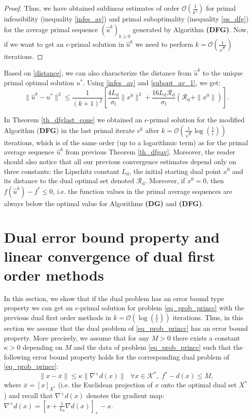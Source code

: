 \documentclass{gOMS2e}
\theoremstyle{plain}
\theoremstyle{definition}
\theoremstyle{remark}
\begin{document}
\begin{proof}
\noindent Thus,  we have obtained sublinear estimates  of order
$\mathcal{O}(\frac{1}{k^2})$ for primal infeasibility (inequality
\eqref{infes_av}) and primal suboptimality (inequality
\eqref{ps_dfg}) for the average primal  sequence $(\hat{u}^k)_{k
\geq 0}$ generated by Algorithm \textbf{(DFG)}.   Now, if we want to
get an $\epsilon$-primal solution in $\hat{u}^{k}$ we need to
perform $k = {\mathcal O} (\frac{1}{\sqrt{\epsilon}})$ iterations.
\end{proof}

\noindent Based on \eqref{distance}, we can also characterize the
distance from $\hat u^k$ to the unique primal optimal solution
$u^*$. Using  \eqref{infes_av} and \eqref{subopt_av_1}, we get:
\[   \| \hat u^k - {}{u}^*\|^2  \leq
\frac{1}{(k+1)^2} \left[ \frac{4 L_\text{d}}{\sigma_{\mathrm{f}}} \|x^0\|^2 + \frac{16 L_\text{d} \mathcal{R}_\text{d}}{\sigma_{\mathrm{f}}}
 (\mathcal{R}_\text{d} + \|x^0\|) \right]. \]

\noindent In Theorem \ref{th_dfglast_cone}  we obtained an
$\epsilon$-primal solution for the modified Algorithm (\textbf{DFG})
in the last primal iterate $v^{k}$ after $k =
\mathcal{O}(\frac{1}{\sqrt{\epsilon}} \log(\frac{1}{\epsilon}))$
iterations, which  is of the same order (up to a logarithmic term)
as for the primal average sequence  $\hat u^k$ from previous Theorem
\ref{th_dfgav}. Moreover, the reader should also notice that all our
previous  convergence estimates depend only on three  constants: the
Lipschitz constant $L_\text{d}$, the initial starting dual point
$x^0$ and its distance to the dual optimal  set denoted
$\mathcal{R}_\text{d}$. Moreover, if $x^0=0$, then $f(\hat u^k) -
f^* \leq 0$, i.e. the function values in  the primal average
sequences  are always below the optimal value for Algorithms
\textbf{(DG)} and \textbf{(DFG)}.

\section{Dual error bound property and linear convergence of dual first order methods}
\label{sec_lin}
In this section, we show that if the dual problem has an error bound type property we can get an $\epsilon$-primal solution for problem \eqref{eq_prob_princc}  with the previous dual first order methods in $k = \mathcal{O}(\log(\frac{1}{\epsilon}))$ iterations. Thus, in this section we assume that the dual problem of \eqref{eq_prob_princc} has an error bound property. More precisely, we assume that  for any $M>0$ there exists a constant  $\kappa > 0$ depending on $M$ and the data of problem \eqref{eq_prob_princc} such that the following
error bound property holds for the  corresponding dual problem of \eqref{eq_prob_princc}:
\begin{equation}
\label{eq_error_bound} \|x - \bar{x}\| \leq \kappa \|\nabla^+
d(x)\| ~~~ \forall x \in {{\mathcal{K}}^*}, \; f^* - d(x) \leq M,
\end{equation}
where  $\bar{x}=\left[x\right]_{X^*}$ (i.e. the Euclidean projection
of $x$ onto the optimal dual set $X^*$)  and recall that  $\nabla^+ d(x)$ denotes the gradient map: $\nabla^+ d(x)= [x +  \frac{1}{L_\text{d}} \nabla
d(x)]_{+} - x$.
\end{document}
